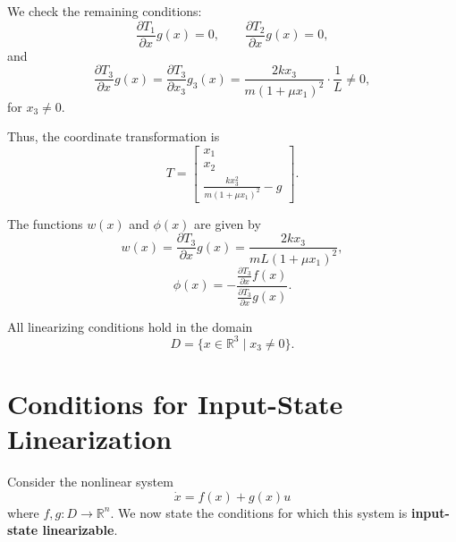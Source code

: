 \begin{example}
We check the remaining conditions:
\begin{equation}
\frac{\partial T_1}{\partial x} g(x) = 0, \qquad 
\frac{\partial T_2}{\partial x} g(x) = 0,
\end{equation}
and
\begin{equation}
\frac{\partial T_3}{\partial x} g(x)
= \frac{\partial T_3}{\partial x_3} g_3(x)
= \frac{2k x_3}{m(1+\mu x_1)^2} \cdot \frac{1}{L} \neq 0,
\end{equation}
for \( x_3 \neq 0 \).

Thus, the coordinate transformation is
\begin{equation}
T =
\begin{bmatrix}
x_1 \\[3pt]
x_2 \\[3pt]
\frac{kx_3^2}{m(1+\mu x_1)^2} - g
\end{bmatrix}.
\end{equation}

The functions \( w(x) \) and \( \phi(x) \) are given by
\begin{equation}
w(x) = \frac{\partial T_3}{\partial x} g(x)
= \frac{2k x_3}{mL(1+\mu x_1)^2},
\end{equation}
\begin{equation}
\phi(x) = -\frac{\frac{\partial T_3}{\partial x} f(x)}{\frac{\partial T_3}{\partial x} g(x)}.
\end{equation}

All linearizing conditions hold in the domain
\begin{equation}
D = \{ x \in \mathbb{R}^3 \mid x_3 \neq 0 \}.
\end{equation}
\end{example}

\section{Conditions for Input-State Linearization}

Consider the nonlinear system
\begin{equation}
\dot{x} = f(x) + g(x)u
\label{eq:10.28}
\end{equation}
where $f, g : D \to \mathbb{R}^n$.  
We now state the conditions for which this system is \textbf{input-state linearizable}.

